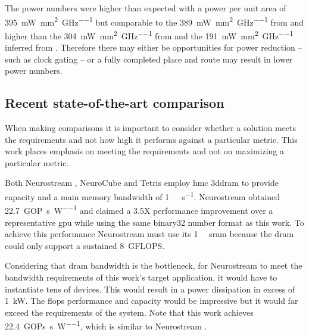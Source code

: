 The power numbers were higher than expected %
with a power per unit area of \SI[per-mode=symbol]{395}{\milli\watt\per\square\milli\meter\per\giga\hertz} but comparable to the \SI[per-mode=symbol]{389}{\milli\watt\per\square\milli\meter\per\giga\hertz} from \cite{chen2016diannao} and higher than the \SI[per-mode=symbol]{304}{\milli\watt\per\square\milli\meter\per\giga\hertz} from \cite{azarkhish2017neurostream} and the \SI[per-mode=symbol]{191}{\milli\watt\per\square\milli\meter\per\giga\hertz} inferred from \cite{jouppi2017datacenter}.
Therefore there may either be opportunities for power reduction -- such as clock gating -- or a fully completed place and route may result in lower power numbers.

\subsection{Recent state-of-the-art comparison}
\label{sec:State-of-the-art Comparison}
When making comparisons it is important to consider whether a solution meets the requirements and not how high it performs against a particular metric.
This work places emphasis on meeting the requirements and not on maximizing a particular metric.

Both Neurostream \cite{azarkhish2017neurostream}, NeuroCube \cite{kim2016neurocube} and Tetris \cite{gao2017tetris} employ \ac{hmc} \ac{3ddram} to provide capacity and a main memory bandwidth of \SI[per-mode=symbol]{1}{\tera\bit\per\second}.
Neurostream \cite{azarkhish2017neurostream} obtained \SI[per-mode=symbol]{22.7}{\giga OP\per\second\per\watt} and claimed a 3.5X performance improvement over a representative \ac{gpu} while using the same \ac{binary32} number format as this work.
To achieve this performance Neurostream must use its \SI[per-mode=symbol]{1}{\mega\bit} \ac{sram} because the \ac{dram} could only support a sustained \SI[per-mode=symbol]{8}{\giga FLOPS}.

Considering that \ac{dram} bandwidth is the bottleneck, for Neurostream \cite{azarkhish2017neurostream} to meet the bandwidth requirements of this work's target application, it would have to instantiate tens of devices.
This would result in a power dissipation in excess of \SI[per-mode=symbol]{1}{\kilo\watt}.
The \acp{flop} performance and capacity would be impressive but it would far exceed the requirements of the system.
Note that this work achieves \SI[per-mode=symbol]{22.4}{\giga OPs\per\second\per\watt}, which is similar to Neurostream \cite{azarkhish2017neurostream}.

